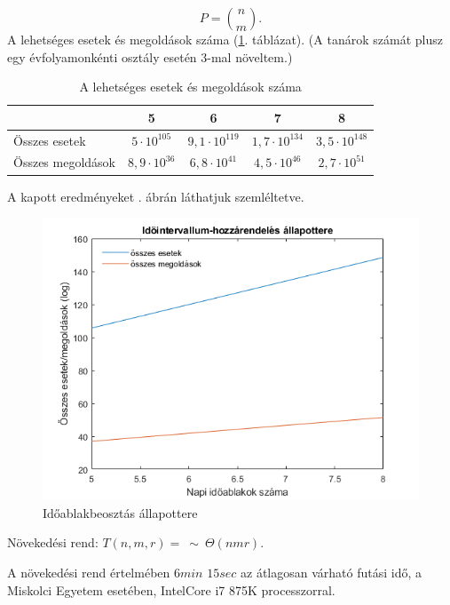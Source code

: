 $$P=\binom{n}{m}.$$
A lehetséges esetek és megoldások száma (\ref{tab:complexity2}. táblázat). (A tanárok számát plusz egy évfolyamonkénti osztály esetén 3-mal növeltem.)

\begin{table}[h!]
\centering
\caption{A lehetséges esetek és megoldások száma}
\label{tab:complexity2}
\medskip
\begin{tabular}{|l|c|c|c|c|}
\hline
& 5 & 6 & 7 & 8 \\
\hline
Összes esetek & $5 \cdot 10^{105}$ & $9,1 \cdot 10^{119}$ & $1,7 \cdot 10^{134}$ & $3,5 \cdot 10^{148}$ \\
\hline 
Összes megoldások & $8,9 \cdot 10^{36}$ & $6,8 \cdot 10^{41}$ & $4,5 \cdot 10^{46}$ & $2,7 \cdot 10^{51}$ \\
\hline
\end{tabular}
\end{table}

A kapott eredményeket . ábrán láthatjuk szemléltetve.

\begin{figure}[h!]
	\includegraphics[width=\linewidth]{images/idoablak.png}
	\caption{Időablakbeosztás állapottere}
	\label{fig:idoablak}
\end{figure}

Növekedési rend: $T(n,m,r)=\ \sim \ \Theta(nmr)$.

A növekedési rend értelmében $6min$ $15sec$ az átlagosan várható futási idő, a Miskolci Egyetem esetében, IntelCore i7 875K processzorral. 


